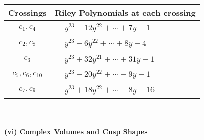 \documentclass[1p]{elsarticle_modified}
\theoremstyle{definition}
\begin{document}
\begin{tabular}{m{50pt}|m{274pt}}
Crossings & \hspace{64pt}Riley Polynomials at each crossing \\
\hline $$\begin{aligned}c_{1},c_{4}\end{aligned}$$&$\begin{aligned}
&y^{23}-12 y^{22}+\cdots+7 y-1
\end{aligned}$\\
\hline $$\begin{aligned}c_{2},c_{8}\end{aligned}$$&$\begin{aligned}
&y^{23}-6 y^{22}+\cdots+8 y-4
\end{aligned}$\\
\hline $$\begin{aligned}c_{3}\end{aligned}$$&$\begin{aligned}
&y^{23}+32 y^{21}+\cdots+31 y-1
\end{aligned}$\\
\hline $$\begin{aligned}c_{5},c_{6},c_{10}\end{aligned}$$&$\begin{aligned}
&y^{23}-20 y^{22}+\cdots-9 y-1
\end{aligned}$\\
\hline $$\begin{aligned}c_{7},c_{9}\end{aligned}$$&$\begin{aligned}
&y^{23}+18 y^{22}+\cdots-8 y-16
\end{aligned}$\\
\hline
\end{tabular}\\~\\
\newpage\flushleft \textbf{(vi) Complex Volumes and Cusp Shapes}
\end{document}
